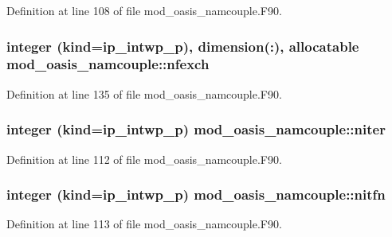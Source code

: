 Definition at line 108 of file mod\+\_\+oasis\+\_\+namcouple.\+F90.

\hypertarget{classmod__oasis__namcouple_ac6216c78a2779e49f90a9a95a39c27d7}{
\subsubsection[{nfexch}]{\setlength{\rightskip}{0pt plus 5cm}integer (kind=ip\+\_\+intwp\+\_\+p), dimension(\+:), allocatable mod\+\_\+oasis\+\_\+namcouple\+::nfexch\hspace{0.3cm}{\ttfamily [private]}}}\label{classmod__oasis__namcouple_ac6216c78a2779e49f90a9a95a39c27d7}


Definition at line 135 of file mod\+\_\+oasis\+\_\+namcouple.\+F90.

\hypertarget{classmod__oasis__namcouple_a6246780a56635119fd8f7935456b06cf}{
\subsubsection[{niter}]{\setlength{\rightskip}{0pt plus 5cm}integer (kind=ip\+\_\+intwp\+\_\+p) mod\+\_\+oasis\+\_\+namcouple\+::niter\hspace{0.3cm}{\ttfamily [private]}}}\label{classmod__oasis__namcouple_a6246780a56635119fd8f7935456b06cf}


Definition at line 112 of file mod\+\_\+oasis\+\_\+namcouple.\+F90.

\hypertarget{classmod__oasis__namcouple_a1e5b5efd046e5ab959fba026bd645945}{
\subsubsection[{nitfn}]{\setlength{\rightskip}{0pt plus 5cm}integer (kind=ip\+\_\+intwp\+\_\+p) mod\+\_\+oasis\+\_\+namcouple\+::nitfn\hspace{0.3cm}{\ttfamily [private]}}}\label{classmod__oasis__namcouple_a1e5b5efd046e5ab959fba026bd645945}


Definition at line 113 of file mod\+\_\+oasis\+\_\+namcouple.\+F90.

